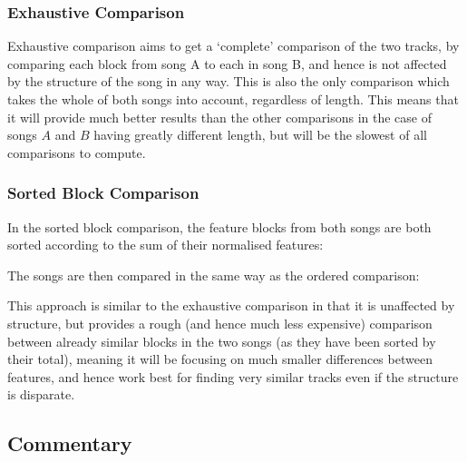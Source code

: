\subsubsection{Exhaustive Comparison}

Exhaustive comparison aims to get a `complete' comparison of the two tracks, by comparing each block from song A to each in song B, and hence is not affected by the structure of the song in any way. This is also the only comparison which takes the whole of both songs into account, regardless of length. This means that it will provide much better results than the other comparisons in the case of songs $A$ and $B$ having greatly different length, but will be the slowest of all comparisons to compute.
\subsubsection{Sorted Block Comparison}
In the sorted block comparison, the feature blocks from both songs are both sorted according to the sum of their normalised features:

The songs are then compared in the same way as the ordered comparison:

This approach is similar to the exhaustive comparison in that it is unaffected by structure, but provides a rough (and hence much less expensive) comparison between already similar blocks in the two songs (as they have been sorted by their total), meaning it will be focusing on much smaller differences between features, and hence work best for finding very similar tracks even if the structure is disparate.
\subsection{Commentary}
